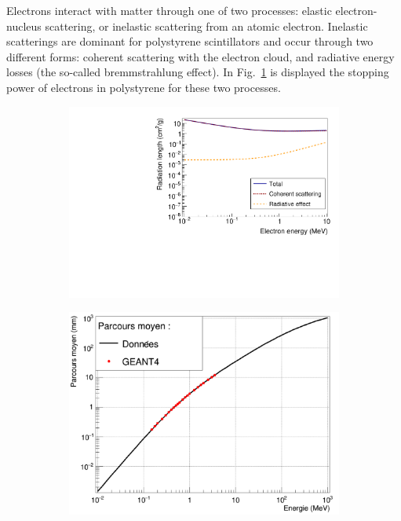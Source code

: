 Electrons interact with matter through one of two processes: elastic electron-nucleus scattering, or inelastic scattering from an atomic electron.
Inelastic scatterings are dominant for polystyrene scintillators and occur through two different forms: coherent scattering with the electron cloud, and radiative energy losses (the so-called bremmstrahlung effect).
In Fig.~\ref{subfig:electron_attenuation} is displayed the stopping power of electrons in polystyrene for these two processes.
\begin{figure}[h]
  \centering
  \begin{subfigure}[t]{0.48\textwidth}
    \centering
    \includegraphics[width=1\textwidth]{commissioning/fig_commissioning/electron_energy_loss.pdf}
    \captionsetup{justification=centering}
    \caption{
      \label{subfig:electron_attenuation}}
  \end{subfigure}
  \hfill
  \begin{subfigure}[t]{0.48\textwidth}
    \centering
    \includegraphics[width=1\textwidth]{commissioning/fig_commissioning/free_path_electrons.pdf}

\end{subfigure}
\end{figure}

